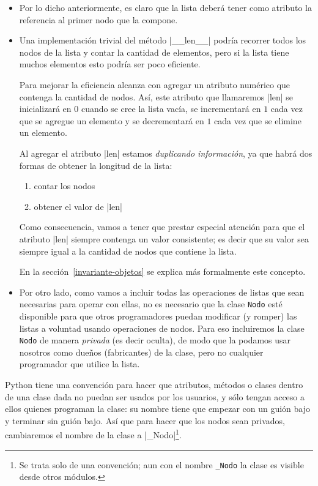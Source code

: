 \begin{itemize}

\item Por lo dicho anteriormente, es claro que la lista deberá tener como
atributo la referencia al primer nodo que la compone.

\item Una implementación trivial del método |__len__| podría
recorrer todos los nodos de la lista y contar la cantidad de elementos,
pero si la lista tiene muchos elementos esto podría ser poco eficiente.

Para mejorar la eficiencia alcanza con agregar un atributo numérico que
contenga la cantidad de nodos. Así, este atributo que llamaremos |len|
se inicializará en $0$ cuando se cree la lista vacía, se
incrementará en $1$ cada vez que se agregue un elemento y se decrementará en $1$
cada vez que se elimine un elemento.

\begin{atencion}
Al agregar el atributo |len| estamos \emph{duplicando información}, ya que habrá
dos formas de obtener la longitud de la lista:

\begin{enumerate}
\item contar los nodos
\item obtener el valor de |len|
\end{enumerate}

Como consecuencia, vamos a tener que prestar especial atención para que el
atributo |len| siempre contenga un valor consistente; es decir que su valor sea
siempre igual a la cantidad de nodos que contiene la lista.

En la sección~\ref{invariante-objetos} se explica más formalmente este
concepto.
\end{atencion}

\item Por otro lado, como vamos a incluir todas las operaciones de listas
que sean necesarias para operar con ellas, no es necesario que la clase
\lstinline!Nodo! esté disponible para que otros programadores puedan
modificar (y romper) las listas a voluntad usando operaciones de nodos. Para eso
incluiremos la clase \lstinline!Nodo! de manera \emph{privada} (es
decir oculta), de modo que la podamos usar nosotros como dueños
(fabricantes) de la clase, pero no cualquier programador que utilice la
lista.
\end{itemize}

Python tiene una convención para hacer que atributos, métodos o clases
dentro de una clase dada no puedan ser usados por los usuarios, y sólo
tengan acceso a ellos quienes programan la clase: su nombre tiene que
empezar con un guión bajo y terminar sin guión bajo. Así que para hacer que
los nodos sean privados, cambiaremos el nombre de la clase a
|_Nodo|\footnote{Se trata solo de una convención; aun con el nombre
\lstinline!_Nodo! la clase es visible desde otros módulos.}.

